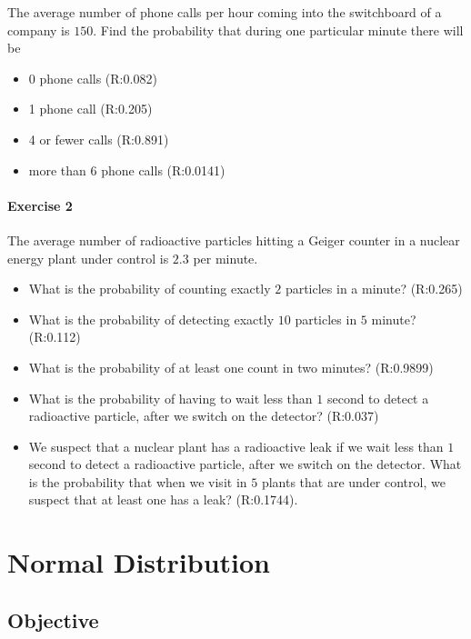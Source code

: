 \documentclass[
]{book}
\providecommand{\tightlist}{%
  \setlength{\itemsep}{0pt}\setlength{\parskip}{0pt}}
\begin{document}
The average number of phone calls per hour coming into the switchboard of a company is \(150\). Find the probability that during one particular minute there will be

\begin{itemize}
\tightlist
\item
  0 phone calls (R:0.082)
\item
  1 phone call (R:0.205)
\item
  4 or fewer calls (R:0.891)
\item
  more than 6 phone calls (R:0.0141)
\end{itemize}

\hypertarget{exercise-2-5}{%
\subsubsection{Exercise 2}\label{exercise-2-5}}

The average number of radioactive particles hitting a Geiger counter in a nuclear energy plant under control is \(2.3\) per minute.

\begin{itemize}
\item
  What is the probability of counting exactly \(2\) particles in a minute? (R:0.265)
\item
  What is the probability of detecting exactly \(10\) particles in \(5\) minute? (R:0.112)
\item
  What is the probability of at least one count in two minutes? (R:0.9899)
\item
  What is the probability of having to wait less than \(1\) second to detect a radioactive particle, after we switch on the detector? (R:0.037)
\item
  We suspect that a nuclear plant has a radioactive leak if we wait less than \(1\) second to detect a radioactive particle, after we switch on the detector. What is the probability that when we visit in \(5\) plants that are under control, we suspect that at least one has a leak? (R:0.1744).
\end{itemize}

\hypertarget{normal-distribution}{%
\chapter{Normal Distribution}\label{normal-distribution}}

\hypertarget{objective-5}{%
\section{Objective}\label{objective-5}}
\end{document}
